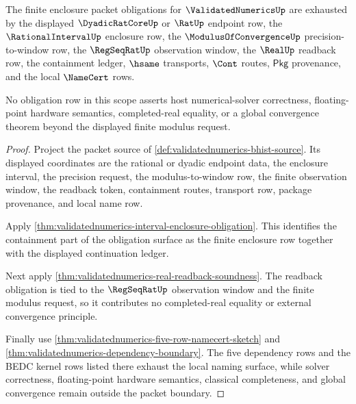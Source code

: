\begin{theorem}
\label{thm:validatednumerics-obligation-closure-scope}
The finite enclosure packet obligations for $\ValidatedNumericsUp$ are
exhausted by the displayed $\DyadicRatCoreUp$ or $\RatUp$ endpoint row, the
$\RationalIntervalUp$ enclosure row, the $\ModulusOfConvergenceUp$
precision-to-window row, the $\RegSeqRatUp$ observation window, the $\RealUp$
readback row, the containment ledger, $\hsame$ transports, $\Cont$ routes,
$\mathsf{Pkg}$ provenance, and the local $\NameCert$ rows.

No obligation row in this scope asserts host numerical-solver correctness,
floating-point hardware semantics, completed-real equality, or a global
convergence theorem beyond the displayed finite modulus request.
\end{theorem}
\begin{proof}
Project the packet source of
\autoref{def:validatednumerics-bhist-source}. Its displayed coordinates are
the rational or dyadic endpoint data, the enclosure interval, the precision
request, the modulus-to-window row, the finite observation window, the
readback token, containment routes, transport row, package provenance, and
local name row.

Apply \autoref{thm:validatednumerics-interval-enclosure-obligation}. This
identifies the containment part of the obligation surface as the finite
enclosure row together with the displayed continuation ledger.

Next apply \autoref{thm:validatednumerics-real-readback-soundness}. The
readback obligation is tied to the $\RegSeqRatUp$ observation window and the
finite modulus request, so it contributes no completed-real equality or
external convergence principle.

Finally use \autoref{thm:validatednumerics-five-row-namecert-sketch} and
\autoref{thm:validatednumerics-dependency-boundary}. The five dependency rows
and the BEDC kernel rows listed there exhaust the local naming surface, while
solver correctness, floating-point hardware semantics, classical completeness,
and global convergence remain outside the packet boundary.
\end{proof}

